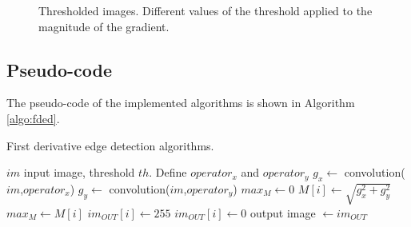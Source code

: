 \documentclass{ipol}
\numberwithin{equation}{section}
\numberwithin{table}{section}
\begin{document}
\begin{figure}[t!]
	\centering
	\quad
	\quad
	\caption{Thresholded images. Different values of the threshold applied to the magnitude of the gradient.}
	\label{fig:thresholding}
\end{figure}



\subsection{Pseudo-code}

The pseudo-code of the implemented algorithms is shown in Algorithm \ref{algo:fded}.

\clearpage

\begin{algorithm}[t]
\caption{First derivative edge detection algorithms.}
\label{algo:fded}
\begin{algorithmic}[1]
\REQUIRE $im$ input image, threshold $th$.
\STATE Define $operator_x$ and $operator_y$ 
\STATE $g_x \leftarrow$ convolution($im$,$operator_x$)
\STATE $g_y \leftarrow$ convolution($im$,$operator_y$)
\STATE $max_M \leftarrow 0$
	\STATE $M[i] \leftarrow \sqrt{g_x^2+g_y^2}$ 
		\STATE $max_M \leftarrow M[i]$
	\ENDIF
\ENDFOR
{}
		\STATE $im_{OUT}[i] \leftarrow 255$
	\ELSE
		\STATE $im_{OUT}[i] \leftarrow 0$
	\ENDIF
\ENDFOR
\RETURN output image $\leftarrow im_{OUT}$
\end{algorithmic}
\end{algorithm}
\end{document}
